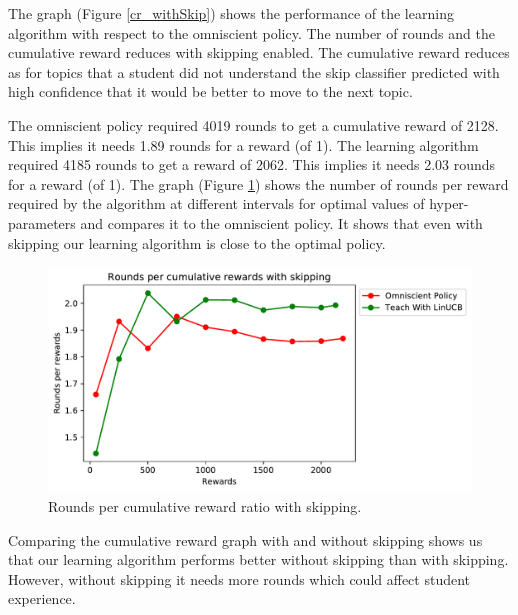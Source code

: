 
The graph (Figure \ref{cr_withSkip}) shows the performance of the learning algorithm with respect to the omniscient policy. The number of rounds and the cumulative reward reduces with skipping enabled. The cumulative reward reduces as for topics that a student did not understand the skip classifier predicted with high confidence that it would be better to move to the next topic. \par

The omniscient policy required 4019 rounds to get a cumulative reward of 2128. This implies it needs 1.89 rounds for a reward (of 1). The learning algorithm required 4185 rounds to get a reward of 2062. This implies it needs 2.03 rounds for a reward (of 1). The graph (Figure \ref{chap6:rprr_skip}) shows the number of rounds per reward required by the algorithm at different intervals for optimal values of hyper-parameters and compares it to the omniscient policy. It shows that even with skipping our learning algorithm is close to the optimal policy. \par

\begin{figure}[H]
    \centering
    \includegraphics[scale=0.95]{Figures/rounds_per_reward_ratio_with_skipping.pdf}
    \caption{Rounds per cumulative reward ratio with skipping.}
    \label{chap6:rprr_skip}
\end{figure}

Comparing the cumulative reward graph with and without skipping shows us that our learning algorithm performs better without skipping than with skipping. However, without skipping it needs more rounds which could affect student experience. \par

